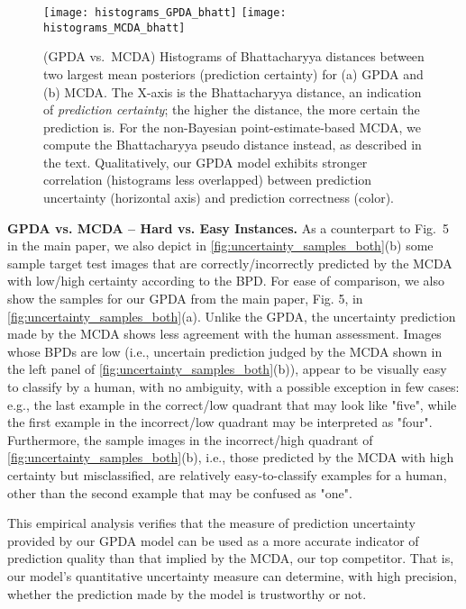 \documentclass[10pt,letterpaper]{article}
\begin{document}
\begin{figure}\begin{center}
\texttt{[image: histograms\_GPDA\_bhatt]} 
\texttt{[image: histograms\_MCDA\_bhatt]}
\end{center}
\vspace{-1.7em}
\caption{(GPDA vs.~MCDA) Histograms of Bhattacharyya distances between two largest mean posteriors (prediction certainty) for (a) GPDA and (b) MCDA. The X-axis is the Bhattacharyya distance, an indication of {\em prediction certainty}; the higher the distance, the more certain the prediction is. For the non-Bayesian point-estimate-based MCDA, we compute the  Bhattacharyya pseudo distance instead, as described in the text. Qualitatively, our GPDA model exhibits stronger correlation (histograms less overlapped) between prediction uncertainty (horizontal axis) and prediction correctness (color).}
\label{fig:uncertainty_bhatt_both}
\end{figure}


\noindent\textbf{GPDA vs. MCDA -- Hard vs. Easy Instances.} As a counterpart to Fig.~5 in the main paper, we also depict in \autoref{fig:uncertainty_samples_both}(b) some sample target test images that are correctly/incorrectly predicted by the MCDA with low/high certainty according to the BPD. For ease of comparison, we also show the samples for our GPDA from the main paper, Fig. 5, in \autoref{fig:uncertainty_samples_both}(a). 
Unlike the GPDA, the uncertainty prediction made by the MCDA shows less agreement with the human assessment. Images whose BPDs are low (i.e., uncertain prediction judged by the MCDA shown in the left panel of \autoref{fig:uncertainty_samples_both}(b)), appear to be visually easy to classify by a human, with no ambiguity, with a possible exception in few cases: e.g., the last example in the correct/low quadrant that may look like "five", while the first example in the incorrect/low quadrant may be interpreted as "four".  Furthermore, the sample images in the incorrect/high quadrant of \autoref{fig:uncertainty_samples_both}(b), i.e., those predicted by the MCDA with high certainty but misclassified, are relatively easy-to-classify examples for a human, other than the second example that may be confused as "one". 

This empirical analysis verifies that the measure of prediction uncertainty provided by our GPDA model can be used as a more accurate indicator of prediction quality than that implied by the MCDA, our top competitor. That is, our model's quantitative uncertainty measure can determine, with high precision, whether the prediction made by the model is trustworthy or not.
\end{document}
